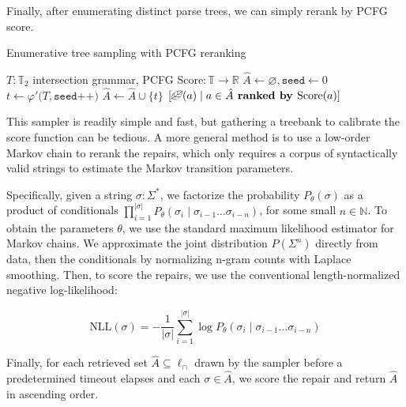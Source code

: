 \documentclass[runningheads]{llncs}
\begin{document}
Finally, after enumerating distinct parse trees, we can simply rerank by PCFG score.

\begin{algorithm}[H]
\caption{Enumerative tree sampling with PCFG reranking}
\label{alg:enum_pcfg}
\begin{algorithmic}[1]
\Require $T: \mathbb{T}_2$ intersection grammar, PCFG Score$: \mathbb{T} \rightarrow \mathbb{R}$
\State $\hat{A} \gets \varnothing, \texttt{seed} \gets 0$ 
\State $t \gets \varphi'\big(T, \texttt{seed++})$ 
\State $\hat{A} \gets \hat{A} \cup \{t\}$
\EndFor
\State \Return $[\text{\textleaf}(a) \mid a \in \hat{A} \textbf{ ranked by } \text{Score}(a)]$ 
\end{algorithmic}
\end{algorithm}

This sampler is readily simple and fast, but gathering a treebank to calibrate the score function can be tedious. A more general method is to use a low-order Markov chain to rerank the repairs, which only requires a corpus of syntactically valid strings to estimate the Markov transition parameters.

Specifically, given a string $\sigma: \Sigma^*$, we factorize the probability $P_\theta(\sigma)$ as a product of conditionals $\prod_{i=1}^{|\sigma|}P_\theta(\sigma_i \mid \sigma_{i-1}\ldots\sigma_{i-n})$, for some small $n \in \mathbb{N}$. To obtain the parameters $\theta$, we use the standard maximum likelihood estimator for Markov chains. We approximate the joint distribution $P(\Sigma^n)$ directly from data, then the conditionals by normalizing n-gram counts with Laplace smoothing. Then, to score the repairs, we use the conventional length-normalized negative log-likelihood:

\begin{equation}
\text{NLL}(\sigma) = -\frac{1}{|\sigma|}\sum_{i=1}^{|\sigma|}\log P_\theta(\sigma_i \mid \sigma_{i-1}\ldots\sigma_{i-n})
\end{equation}

Finally, for each retrieved set $\hat{A} \subseteq \ell_\cap$ drawn by the sampler before a predetermined timeout elapses and each $\sigma \in \hat{A}$, we score the repair and return $\hat{A}$ in ascending order.
\end{document}
